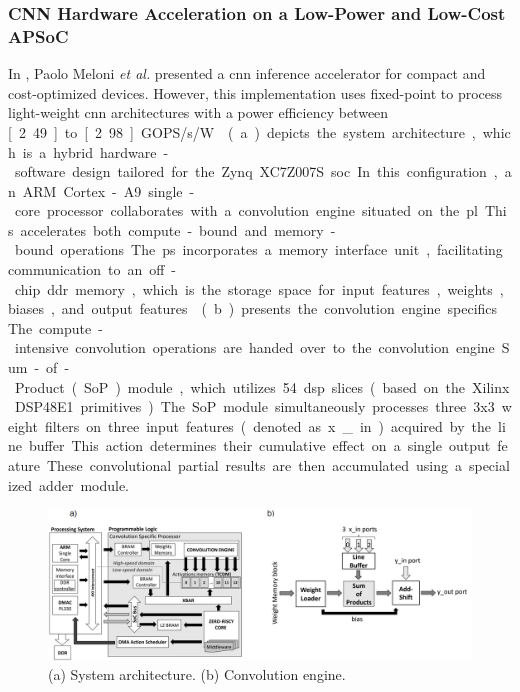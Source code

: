 \FloatBarrier

\subsubsection{CNN Hardware Acceleration on a Low-Power and Low-Cost APSoC}
In \cite{meloni2019cnn}, Paolo Meloni \textit{et al.} presented a \gls{cnn} inference accelerator for compact and cost-optimized devices. However, this implementation uses fixed-point to process light-weight \gls{cnn} architectures with a power efficiency between \unit[2.49] to \unit[2.98]{GOPS/s/W}.

(a) depicts the system architecture, which is a hybrid hardware-software design tailored for the Zynq XC7Z007S \gls{soc}. In this configuration, an ARM Cortex-A9 single-core processor collaborates with a convolution engine situated on the \gls{pl}. This accelerates both compute-bound and memory-bound operations. The \gls{ps} incorporates a memory interface unit, facilitating communication to an off-chip \gls{ddr} memory, which is the storage space for input features, weights, biases, and output features.

(b) presents the convolution engine specifics. The compute-intensive convolution operations are handed over to the convolution engine Sum-of-Product (SoP) module, which utilizes 54 \gls{dsp} slices (based on the Xilinx DSP48E1 primitives). The SoP module simultaneously processes three 3x3 weight filters on three input features (denoted as x\_in) acquired by the line buffer. This action determines their cumulative effect on a single output feature. These convolutional partial results are then accumulated using a specialized adder module.

\begin{figure}[h!]
	\centering
	\includegraphics[width=\textwidth]{./figures/4_g.png}
	\caption{(a) System architecture. (b) Convolution engine.}
	\label{fig:meloni2019cnn}
\end{figure}
\FloatBarrier


